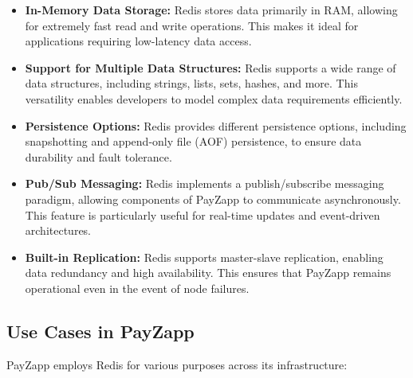 \documentclass[12pt,a4paper]{report}
\begin{document}
\begin{itemize}
    \item \textbf{In-Memory Data Storage:} Redis stores data primarily in RAM, allowing for extremely fast read and write operations. This makes it ideal for applications requiring low-latency data access.
    
    \item \textbf{Support for Multiple Data Structures:} Redis supports a wide range of data structures, including strings, lists, sets, hashes, and more. This versatility enables developers to model complex data requirements efficiently.
    
    \item \textbf{Persistence Options:} Redis provides different persistence options, including snapshotting and append-only file (AOF) persistence, to ensure data durability and fault tolerance.
    
    \item \textbf{Pub/Sub Messaging:} Redis implements a publish/subscribe messaging paradigm, allowing components of PayZapp to communicate asynchronously. This feature is particularly useful for real-time updates and event-driven architectures.
    
    \item \textbf{Built-in Replication:} Redis supports master-slave replication, enabling data redundancy and high availability. This ensures that PayZapp remains operational even in the event of node failures.
\end{itemize}

\subsection{Use Cases in PayZapp}

PayZapp employs Redis for various purposes across its infrastructure:
\end{document}
